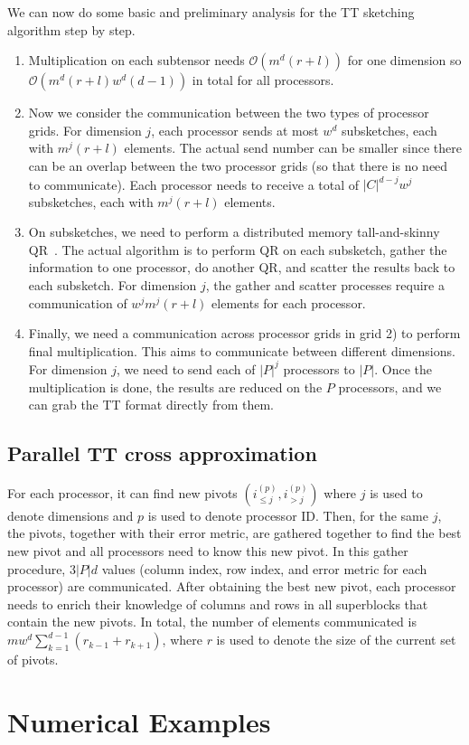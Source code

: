 \documentclass[11pt,a4paper,review]{siamart220329}
\begin{document}
We can now do some basic and preliminary analysis for the TT sketching algorithm step by step.
\begin{enumerate}
\item Multiplication on each subtensor needs $\mathcal{O}(m^d(r+l))$ for one dimension so $\mathcal{O}(m^d(r+l)w^d(d-1))$ in total for all processors.

\item Now we consider the communication between the two types of processor grids. For dimension $j$, each processor sends at most $w^d$ subsketches, each with $m^j(r+l)$ elements. The actual send number can be smaller since there can be an overlap between the two processor grids (so that there is no need to communicate). Each processor needs to receive a total of $|C|^{d-j}w^j$ subsketches, each with $m^j(r+l)$ elements.

\item On subsketches, we need to perform a distributed memory tall-and-skinny QR~\cite{benson2013direct}. The actual algorithm is to perform QR on each subsketch, gather the information to one processor, do another QR, and scatter the results back to each subsketch. For dimension $j$, the gather and scatter processes require a communication of $w^jm^j(r+l)$ elements for each processor.

\item Finally, we need a communication across processor grids in grid 2) to perform final multiplication. This aims to communicate between different dimensions. For dimension $j$, we need to send each of $|P|^j$ processors to $|P|$. Once the multiplication is done, the results are reduced on the $P$ processors, and we can grab the TT format directly from them.

\end{enumerate}

\subsection{Parallel TT cross approximation}
For each processor, it can find new pivots $(i_{\le j}^{(p)},i_{>j}^{(p)})$ where $j$ is used to denote dimensions and $p$ is used to denote processor ID. Then, for the same $j$, the pivots, together with their error metric, are gathered together to find the best new pivot and all processors need to know this new pivot. In this gather procedure, $3|P|d$ values (column index, row index, and error metric for each processor) are communicated. After obtaining the best new pivot, each processor needs to enrich their knowledge of columns and rows in all superblocks that contain the new pivots. In total, the number of elements communicated is $mw^d\sum_{k=1}^{d-1}(r_{k-1}+r_{k+1})$, where $r$ is used to denote the size of the current set of pivots.

\section{Numerical Examples}
\label{sec:NumericalExamples}

\printbibliography
\end{document}
